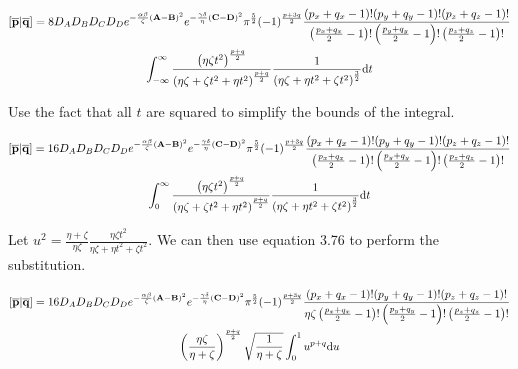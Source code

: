 \begin{multline}
  \left[\overline{\mathbf{p}}\middle|\overline{\mathbf{q}}\right] = 8D_AD_BD_CD_D e^{-\frac{\alpha\beta}{\zeta}\left(\mathbf{A} - \mathbf{B}\right)^2}e^{-\frac{\gamma\delta}{\eta}\left(\mathbf{C} - \mathbf{D}\right)^2}\pi^{\frac{5}{2}}(-1)^{\frac{p + 3q}{2}}\frac{(p_x + q_x - 1)!(p_y + q_y - 1)!(p_z + q_z - 1)!}{\left(\frac{p_x + q_x}{2} - 1\right)!\left(\frac{p_y + q_y}{2} - 1\right)!\left(\frac{p_z + q_z}{2} - 1\right)!}\\
  \int_{-\infty}^\infty \frac{\left(\eta\zeta t^2\right)^{\frac{p + q}{2}}}{\left(\eta\zeta + \zeta t^2 + \eta t^2\right)^{\frac{p + q}{2}}} \frac{1}{\left(\eta\zeta + \eta t^2 + \zeta t^2\right)^{\frac{3}{2}}}\mathrm{d} t
\end{multline}

Use the fact that all $t$ are squared to simplify the bounds of the integral.

\begin{multline}
  \left[\overline{\mathbf{p}}\middle|\overline{\mathbf{q}}\right] = 16D_AD_BD_CD_D e^{-\frac{\alpha\beta}{\zeta}\left(\mathbf{A} - \mathbf{B}\right)^2}e^{-\frac{\gamma\delta}{\eta}\left(\mathbf{C} - \mathbf{D}\right)^2}\pi^{\frac{5}{2}}(-1)^{\frac{p + 3q}{2}}\frac{(p_x + q_x - 1)!(p_y + q_y - 1)!(p_z + q_z - 1)!}{\left(\frac{p_x + q_x}{2} - 1\right)!\left(\frac{p_y + q_y}{2} - 1\right)!\left(\frac{p_z + q_z}{2} - 1\right)!}\\
  \int_0^\infty \frac{\left(\eta\zeta t^2\right)^{\frac{p + q}{2}}}{\left(\eta\zeta + \zeta t^2 + \eta t^2\right)^{\frac{p + q}{2}}} \frac{1}{\left(\eta\zeta + \eta t^2 + \zeta t^2\right)^{\frac{3}{2}}}\mathrm{d} t
\end{multline}

Let $u^2 = \frac{\eta + \zeta}{\eta\zeta}\frac{\eta\zeta t^2}{\eta\zeta + \eta t^2 + \zeta t^2}$. We can then use equation 3.76 to perform the substitution.

\begin{multline}
  \left[\overline{\mathbf{p}}\middle|\overline{\mathbf{q}}\right] = 16D_AD_BD_CD_D e^{-\frac{\alpha\beta}{\zeta}\left(\mathbf{A} - \mathbf{B}\right)^2}e^{-\frac{\gamma\delta}{\eta}\left(\mathbf{C} - \mathbf{D}\right)^2}\pi^{\frac{5}{2}}(-1)^{\frac{p + 3q}{2}}\frac{(p_x + q_x - 1)!(p_y + q_y - 1)!(p_z + q_z - 1)!}{\eta\zeta\left(\frac{p_x + q_x}{2} - 1\right)!\left(\frac{p_y + q_y}{2} - 1\right)!\left(\frac{p_z + q_z}{2} - 1\right)!}\\
  \left(\frac{\eta\zeta}{\eta + \zeta}\right)^{\frac{p + q}{2}}\sqrt{\frac{1}{\eta + \zeta}}\int_0^1 u^{p + q}\mathrm{d} u
\end{multline}

